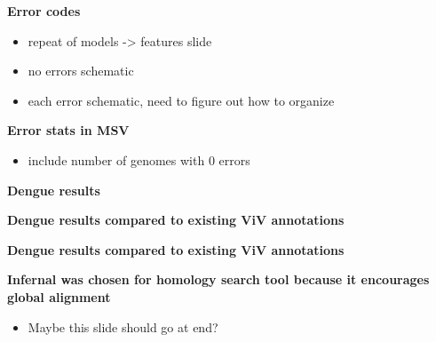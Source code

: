\documentclass[landscape]{slides}
\begin{document}
\begin{slide}
\begin{center}
\textbf{Error codes}

\begin{itemize}
\item repeat of models -> features slide
\item no errors schematic
\item each error schematic, need to figure out how to organize
\end{itemize}

\end{center}
\vfill
\end{slide}
\begin{slide}
\begin{center}
\textbf{Error stats in MSV}

\begin{itemize}
\item include number of genomes with 0 errors
\end{itemize}

\end{center}
\vfill
\end{slide}
\begin{slide}
\begin{center}
\textbf{Dengue results}

\vfill
\end{center}
\end{slide}
\begin{slide}
\begin{center}
\textbf{Dengue results compared to existing ViV annotations}

\vfill
\end{center}
\end{slide}
\begin{slide}
\begin{center}
\textbf{Dengue results compared to existing ViV annotations}

\vfill
\end{center}
\end{slide}
\begin{slide}
\textbf{Infernal was chosen for homology search tool because it
  encourages global alignment}

\begin{itemize}
\item Maybe this slide should go at end? 
\end{itemize}

\vfill
\end{slide}
\end{document}
